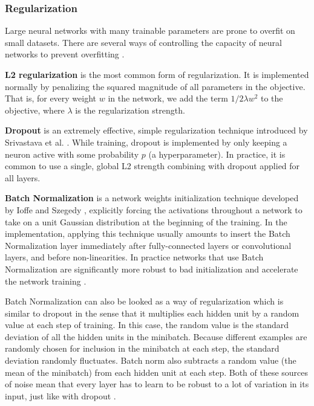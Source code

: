 \subsubsection{Regularization}

Large neural networks with many trainable parameters are prone to overfit on small datasets. There are several ways of controlling the capacity of neural networks to prevent overfitting \cite{Stanforduniversity}.

\noindent\textbf{L2 regularization} is the most common form of regularization. It is implemented normally by penalizing the squared magnitude of all parameters in the objective. That is, for every weight $w$ in the network, we add the term $1/2 \lambda w^2$ to the objective, where $\lambda$ is the regularization strength.

\noindent\textbf{Dropout} is an extremely effective, simple regularization technique introduced by Srivastava et al. \cite{Srivastava2014}. While training, dropout is implemented by only keeping a neuron active with some probability $p$ (a hyperparameter). In practice, it is common to use a single, global L2 strength combining with dropout applied for all layers.

\noindent\textbf{Batch Normalization} is a network weights initialization technique developed by Ioffe and Szegedy \cite{Ioffe2015}, explicitly forcing the activations throughout a network to take on a unit Gaussian distribution at the beginning of the training. In the implementation, applying this technique usually amounts to insert the Batch Normalization layer immediately after fully-connected layers or convolutional layers, and before non-linearities. In practice networks that use Batch Normalization are significantly more robust to bad initialization and accelerate the network training \cite{Stanforduniversity}. 

Batch Normalization can also be looked as a way of regularization which is similar to dropout in the sense that it multiplies each hidden unit by a random value at each step of training. In this case, the random value is the standard deviation of all the hidden units in the minibatch. Because different examples are randomly chosen for inclusion in the minibatch at each step, the standard deviation randomly fluctuates. Batch norm also subtracts a random value (the mean of the minibatch) from each hidden unit at each step. Both of these sources of noise mean that every layer has to learn to be robust to a lot of variation in its input, just like with dropout \cite{Goodfellow2016}.

